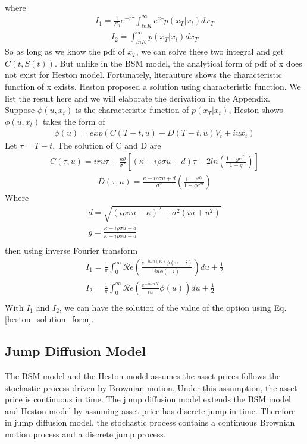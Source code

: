 \documentclass[a4paper]{article}
\begin{document}
where 
\begin{align}
	I_1 = \frac{1}{S_0} e^{-r \tau}\int_{lnK}^{\infty} e^{x_T} p(x_T | x_t) dx_T \label{I_1}
\end{align}
\begin{align}
	I_2 = \int_{lnK}^{\infty}  p(x_T | x_t) dx_T \label{I_2}
\end{align}
So as long as we know the pdf of $x_T$, we can solve these two integral and get $C(t, S(t))$. But unlike in the BSM model, the analytical form of pdf of x does not exist for Heston model. Fortunately, literauture shows the characteristic function of x exists. Heston \cite{heston} proposed a solution using characteristic function. We list the result here and we will elaborate the derivation in the Appendix. \\
Suppose $\phi(u, x_t)$ is the characteristic function of $p(x_T| x_t)$, Heston shows $\phi(u,x_t)$ takes the form of
\begin{align}
	\phi(u) = exp(C(T-t, u) + D(T-t, u)V_t + iux_t) \label{heston_characteristic}
\end{align}
Let $\tau = T - t$. The solution of C and D are
\begin{align} 
	C(\tau, u) = iru\tau + \frac{\kappa \theta}{\sigma^2}
	[(\kappa - i\rho \sigma u + d)\tau - 2ln(\frac{1 - g e^{d\tau}}{1 - g})] \label{heston_C}
\end{align}
\begin{align} 
	D(\tau, u) = \frac{\kappa - i\rho \sigma u + d}{\sigma^2} (\frac{1 - e^{d\tau}}{1-ge^{d\tau}})
		\label{heston_D}
\end{align}
Where
\begin{align*}
	d = \sqrt{(i\rho \sigma u - \kappa)^2 + \sigma^2(i  u + u^2)} \\
	g = \frac{\kappa - i \rho \sigma u + d}{\kappa - i \rho \sigma u -d} \\
\end{align*}
then using inverse Fourier transform
\begin{align*}
	I_1 = \frac{1}{\pi} \int_{0}^{\infty}\mathcal Re(\frac{e^{-iuln(K)}\phi(u-i)}{iu\phi(-i)})du +\frac{1}{2} \\
	I_2 = \frac{1}{\pi} \int_{0}^{\infty}\mathcal Re( \frac{e^{-i u lnK}}{iu} \phi(u))  du + \frac{1}{2} \\
\end{align*}
With $I_1$ and $I_2$, we can have the solution of the value of the option using Eq. \ref{heston_solution_form}.
\iffalse
\subsection{Jump Diffusion Model}
The BSM model and the Heston model assumes the asset prices follows the stochastic process driven by Brownian motion. Under this assumption, the asset price is continuous in time. The jump diffusion model extends the BSM model and Heston model by assuming asset price has discrete jump in time. Therefore in jump diffusion model, the stochastic process contains a continuous Brownian motion process and a discrete jump process.\\
\end{document}
